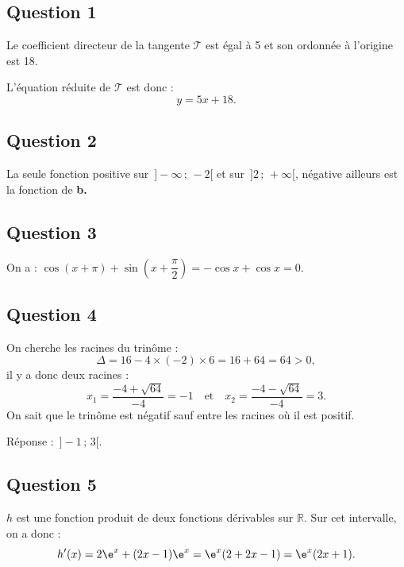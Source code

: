 \subsection*{Question 1}

Le coefficient directeur de la tangente \(\mathcal{T}\) est égal à 5 et son ordonnée à l'origine est 18.

L'équation réduite de \(\mathcal{T}\) est donc :
\[
y = 5x + 18.
\]

\subsection*{Question 2}

La seule fonction positive sur \( \,]-\infty \,;\, -2[ \) et sur \( \,]2 \,;\, +\infty[ \), négative ailleurs est la fonction de \textbf{b.}

\subsection*{Question 3}

On a : \(\cos(x + \pi) + \sin\left(x + \dfrac{\pi}{2}\right) = -\cos x + \cos x = 0\).

\subsection*{Question 4}

On cherche les racines du trinôme :
\[
\Delta = 16 - 4 \times (-2) \times 6 = 16 + 64 = 64 > 0,
\]
il y a donc deux racines :
\[
x_1 = \frac{-4 + \sqrt{64}}{-4} = -1 \quad \text{et} \quad x_2 = \frac{-4 - \sqrt{64}}{-4} = 3.
\]
On sait que le trinôme est négatif sauf entre les racines où il est positif.

Réponse : \( \,]-1 \,;\, 3[\).

\subsection*{Question 5}

\(h\) est une fonction produit de deux fonctions dérivables sur \(\mathbb{R}\). Sur cet intervalle, on a donc :
\[
h'(x) = 2\e^x + (2x - 1)\e^x = \e^x (2 + 2x - 1) = \e^x (2x + 1).
\]
